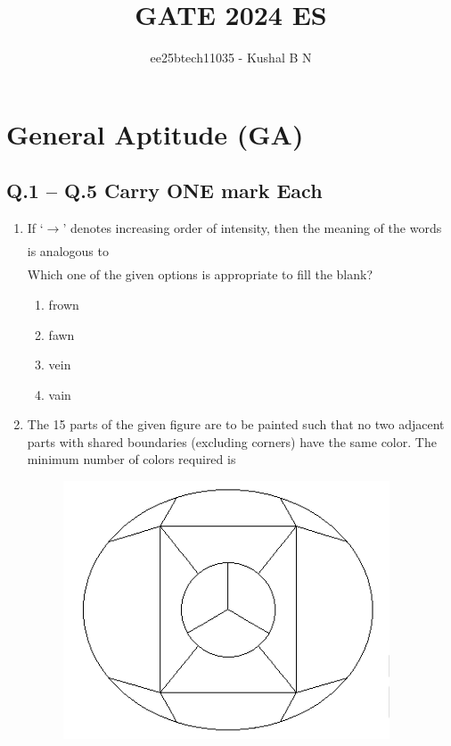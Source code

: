 \documentclass[journal]{IEEEtran}
\title{\textbf{GATE 2024 ES}}
\author{ee25btech11035 - Kushal B N}
\date{}
\begin{document}
\maketitle

\section*{General Aptitude (GA)}

\subsection*{Q.1 -- Q.5 Carry ONE mark Each}

\begin{enumerate}
\item If `$\rightarrow$' denotes increasing order of intensity, then the meaning of the words
\begin{align*}
[\text{sick} \rightarrow \text{infirm} \rightarrow \text{moribund}]
\end{align*}
is analogous to 
\begin{align*}
[\text{silly} \rightarrow \_\_\_\_\_\_ \rightarrow \text{daft}]
\end{align*}
Which one of the given options is appropriate to fill the blank?
\hfill{}

\begin{multicols}{2}
\begin{enumerate}
\item frown
\item fawn
\item vein
\item vain
\end{enumerate}
\end{multicols}

\item The 15 parts of the given figure are to be painted such that no two adjacent parts with shared boundaries (excluding corners) have the same color. The minimum number of colors required is
\hfill{}

\begin{figure}[H]
    \centering
    \includegraphics[width=0.5\columnwidth]{figs/fig1.png}
    \label{fig:placeholder}
\end{figure}


\end{enumerate}
\end{document}
